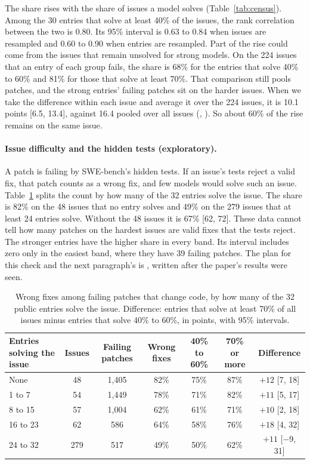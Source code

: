 \documentclass[10pt,letterpaper]{article}
\begin{document}
The share rises with the share of issues a model solves (Table~\ref{tab:census}). Among the 30 entries that solve at
least 40\% of the issues, the rank correlation between the two is 0.80. Its 95\% interval is 0.63 to 0.84 when issues
are resampled and 0.60 to 0.90 when entries are resampled. Part of the rise could come from the issues that remain
unsolved for strong models. On the 224 issues that an entry of each group fails, the share is 68\% for the entries
that solve 40\% to 60\% and 81\% for those that solve at least 70\%. That comparison still pools patches, and the
strong entries' failing patches sit on the harder issues. When we take the difference within each issue and average it
over the 224 issues, it is 10.1 points [6.5, 13.4], against 16.4 pooled over all issues
(, ). So about 60\% of the
rise remains on the same issue.

\paragraph{Issue difficulty and the hidden tests (exploratory).} A patch is failing by SWE-bench's hidden tests. If
an issue's tests reject a valid fix, that patch counts as a wrong fix, and few models would solve such an issue.
Table~\ref{tab:difficulty} splits the count by how many of the 32 entries solve the issue. The share is 82\% on the
48 issues that no entry solves and 49\% on the 279 issues that at least 24 entries solve. Without the 48 issues it is
67\% [62, 72]. These data cannot tell how many patches on the hardest issues are valid fixes that the tests reject.
The stronger entries have the higher share in every band. Its interval includes zero only in the easiest band, where
they have 39 failing patches. The plan for this check and the next paragraph's is
, written after the paper's results were seen.

\begin{table}[H]
\centering
\small
\caption{Wrong fixes among failing patches that change code, by how many of the 32 public entries solve the issue.
Difference: entries that solve at least 70\% of all issues minus entries that solve 40\% to 60\%, in points, with
95\% intervals.}
\label{tab:difficulty}
\begin{tabular}{@{}lcccccc@{}}
\toprule
Entries solving the issue & Issues & Failing patches & Wrong fixes & 40\% to 60\% & 70\% or more & Difference \\
\midrule
None & 48 & 1,405 & 82\% & 75\% & 87\% & $+12$ [7, 18] \\
1 to 7 & 54 & 1,449 & 78\% & 71\% & 82\% & $+11$ [5, 17] \\
8 to 15 & 57 & 1,004 & 62\% & 61\% & 71\% & $+10$ [2, 18] \\
16 to 23 & 62 & 586 & 64\% & 58\% & 76\% & $+18$ [4, 32] \\
24 to 32 & 279 & 517 & 49\% & 50\% & 62\% & $+11$ [$-9$, 31] \\
\bottomrule
\end{tabular}
\end{table}
\end{document}
